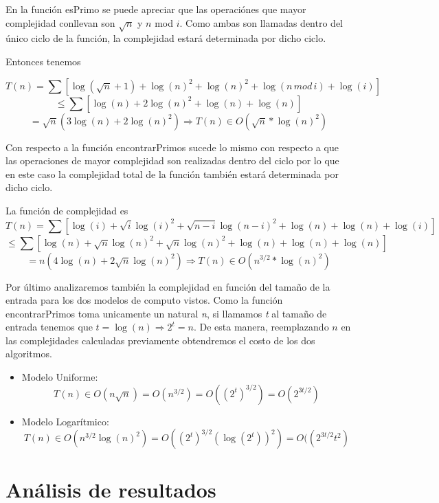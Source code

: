 \documentclass[a4paper,10pt] {article}
\begin{document}
En la funci\'on esPrimo se puede apreciar que las operaci\'ones que mayor
complejidad conllevan son $\sqrt{n}$ y $n$ mod $i$. Como ambas son llamadas
dentro del \'unico ciclo de la funci\'on, la complejidad estar\'a determinada
por dicho ciclo.

Entonces tenemos 

$$ T(n) = \sum
[\log(\sqrt{n}+1)+\log(n)^{2}+\log(n)^{2}+\log(n\,mod\,i)+\log(i)] $$
$$\leq \sum [\log(n)+2\log(n)^{2}+\log(n)+\log(n)] $$
$$= \sqrt{n}(3\log(n)+2\log(n)^{2}) \Longrightarrow T(n) \in O(\sqrt{n}*\log(n)^{2})$$

\bigskip

Con respecto a la funci\'on encontrarPrimos sucede lo mismo con respecto a que
las operaciones de mayor complejidad son realizadas dentro del ciclo por lo que
en este caso la complejidad total de la funci\'on tambi\'en estar\'a determinada
por dicho ciclo.

La funci\'on de complejidad es 
$$ T(n) = \sum
[\log(i)+\sqrt{i}\log(i)^{2}+\sqrt{n-i}\log(n-i)^{2}+\log(n)+\log(n)+\log(i)] $$
$$ \leq \sum [\log(n)+\sqrt{n}\log(n)^{2}+\sqrt{n}\log(n)^{2}+\log(n)+\log(n)+\log(n)] $$
$$ =n(4\log(n)+2\sqrt{n}\log(n)^{2}) \Longrightarrow T(n) \in O(n^{3/2}*\log(n)^{2}) $$

\bigskip

Por \'ultimo analizaremos tambi\'en la complejidad en funci\'on del tama\~{n}o
de la entrada para los dos modelos de computo vistos. Como la funci\'on
encontrarPrimos toma unicamente un natural \textit{n}, si llamamos \textit{t} al
tama\~{n}o de entrada tenemos que $t = \log(n) \Longrightarrow 2^{t} = n$. De
esta manera, reemplazando $n$ en las complejidades calculadas previamente
obtendremos el costo de los dos algoritmos.

\begin{itemize}
\item Modelo Uniforme: 
$$T(n) \in O(n\sqrt{n}) = O(n^{3/2}) = O((2^{t})^{3/2}) =
O(2^{3t/2})$$
\item Modelo Logar\'itmico: 
$$T(n) \in O(n^{3/2}\log(n)^{2}) =
O((2^{t})^{3/2}(\log(2^{t}))^{2}) = O((2^{3t/2}t^{2})$$
\end{itemize}

\section*{An\'alisis de resultados}
\end{document}
